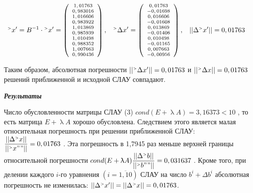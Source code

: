 \documentclass[12pt]{article}
\begin{document}
\begin{equation*}
	\scriptsize
{}^{\mathsmaller{>}} x  ^\prime = B^{-1} \cdot
{}^{\mathsmaller{>}} x  ^\prime = 
\left(
\begin{array}{c}
	1,01763 \\ 0,983016 \\ 1,016606 \\ 0,983922 \\ 1,013869 \\ 0,985939 \\ 1,010498 \\ 0,988352 \\ 1,007663 \\ 0,990436
\end{array}
\right) , \hspace{0.3cm}
{}^{\mathsmaller{>}} \Delta x  ^\prime = 
\left(
\begin{array}{c}
	0,01763 \\ -0,01698 \\ 0,016606 \\ -0,01608 \\ 0,013869 \\ -0,01406 \\ 0,010498 \\ -0,01165 \\ 0,007663 \\ -0,00956
\end{array}
\right)  , \hspace{0.3cm}
|| \Delta 	{}^{\mathsmaller{>}} x^\prime|| = 0,01763 
\end{equation*}

Таким образом, абсолютная погрешности
$ || {}^{\mathsmaller{>}} \Delta x  ^\prime ||  = 0,01763 $ и 
$  || {}^{\mathsmaller{>}} \Delta x  ||  = 0,01763 
$ решений
приближенной и исходной СЛАУ совпадают.

\begin{center}
	\textbf{\textit{Результаты}}
\end{center}
Число обусловленности матрицы СЛАУ (3)
$ cond(E+ \uplambda A) = 3,16373 < 10 $ , то есть матрица
$ E+ \uplambda A $ хорошо обусловлена. Следствием этого является малая относительная погрешность
при решении приближенной СЛАУ:
$ \dfrac{|| \Delta {}^{\mathsmaller{>}} x ||}{|| {}^{\mathsmaller{>}} x ""||} =
 0,01763
$ .
Эта погрешность в 1,7945 раз меньше
верхней границы относительной погрешности
$cond(E+ \uplambda A)
 \dfrac{|| \Delta {}^{\mathsmaller{>}} b ||}{|| {}^{\mathsmaller{>}} b ""||} =
 0,031637
$ .
Кроме
того, при делении каждого $i$-го уравнения  $(i=\overline{1,10})$
СЛАУ на число $b^i + \Delta b^i $ абсолютная
погрешность не изменилась:
$ || \Delta 	{}^{\mathsmaller{>}} x^\prime|| = 
|| \Delta 	{}^{\mathsmaller{>}} x|| =
0,01763 $.
\end{document}
